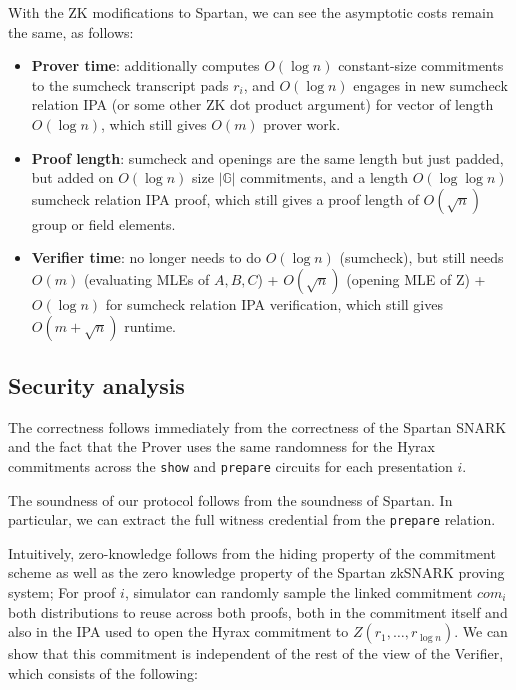 With the ZK modifications to Spartan, we can see the asymptotic costs remain the same, as follows:

\begin{itemize}
    \item \textbf{Prover time}: additionally computes $O(\log n)$ constant-size commitments to the sumcheck transcript pads $r_i$, and $O(\log n)$ engages in new sumcheck relation IPA (or some other ZK dot product argument) for vector of length $O(\log n)$, which still gives $O(m)$ prover work.
    \item \textbf{Proof length}: sumcheck and openings are the same length but just padded, but added on $O(\log n)$ size $|\mathbb{G}|$ commitments, and a length $O(\log\log n)$ sumcheck relation IPA proof, which still gives a proof length of $O(\sqrt n)$ group or field elements.
    \item \textbf{Verifier time}: no longer needs to do $O(\log n)$ (sumcheck), but still needs $O(m)$ (evaluating MLEs of $A,B,C$) + $O(\sqrt{n})$ (opening MLE of Z) + $O(\log n)$ for sumcheck relation IPA verification, which still gives $O(m + \sqrt{n})$ runtime.
\end{itemize}

\subsection{Security analysis}

The correctness follows immediately from the correctness of the Spartan SNARK and the fact that the Prover uses the same randomness for the Hyrax commitments across the \texttt{show} and \texttt{prepare} circuits for each presentation $i$.  

The soundness of our protocol follows from the soundness of Spartan. In particular, we can extract the full witness credential from the \texttt{prepare} relation.

Intuitively, zero-knowledge follows from the hiding property of the commitment scheme as well as the zero knowledge property of the Spartan zkSNARK proving system;
For proof $i$, simulator can randomly sample the linked commitment $com_i$ both distributions to reuse across both proofs, both in the commitment itself and also in the IPA used to open the Hyrax commitment to $Z(r_1, \dots, r_{\log{n}})$. 
We can show that this commitment is independent of the rest of the view of the Verifier, which consists of the following:

